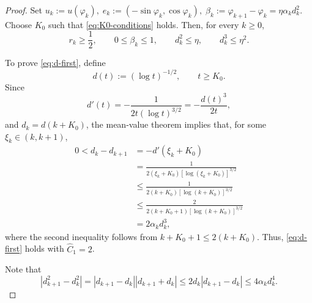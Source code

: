 \documentclass[11pt]{article}
\numberwithin{equation}{section}
\begin{document}
\begin{proof}
Set
$
    u_k:=u(\varphi_k),
    \;
    e_k:=(-\sin\varphi_k,\cos\varphi_k),
    \;
    \beta_k:=\varphi_{k+1}-\varphi_k
             =\eta\alpha_kd_k^2.
$
Choose \(K_0\) such that
\eqref{eq:K0-conditions} holds. Then, for every \(k\geq0\),
\[
r_k\geq\frac12,
\qquad
0\leq\beta_k\leq1,
\qquad
d_k^2\leq\eta,
\qquad
d_k^3\leq\eta^2.
\label{eq:app-K-conditions}
\]


\noindent To prove \eqref{eq:d-first}, define
\[
d(t):=(\log t)^{-1/2},\qquad t\geq K_0.
\]
Since
\[
d'(t)
=-\frac{1}{2t(\log t)^{3/2}}
=-\frac{d(t)^3}{2t},
\]
and \(d_k=d(k+K_0)\), the mean-value theorem implies that, for some
\(\xi_k\in(k,k+1)\),
\begin{align*}
0<d_k-d_{k+1}
&=-d'(\xi_k+K_0)\\
&=\frac{1}{2(\xi_k+K_0)
[\log(\xi_k+K_0)]^{3/2}}\\
&\leq
\frac{1}{2(k+K_0)[\log(k+K_0)]^{3/2}}\\
&\leq
\frac{2}{2(k+K_0+1)[\log(k+K_0)]^{3/2}}\\
&=2\alpha_k d_k^3,
\end{align*}
where the second inequality follows from \(k+K_0+1\leq 2(k+K_0)\).
Thus, \eqref{eq:d-first} holds with
\(\widehat C_1=2\).


Note that
\begin{equation}
    \left|d_{k+1}^2-d_k^2\right|=\left|d_{k+1}-d_k\right|\left|d_{k+1}+d_k\right|\le 2d_k\left|d_{k+1}-d_k\right|
    \leq 4\alpha_kd_k^4.
    \label{eq:app-d-square}
\end{equation}


\end{proof}
\end{document}
